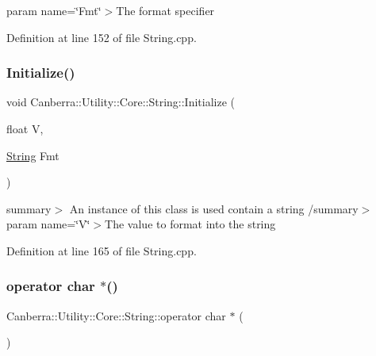param name=\char`\"{}\+Fmt\char`\"{}$>$The format specifier

Definition at line 152 of file String.\+cpp.

\mbox{\label{class_canberra_1_1_utility_1_1_core_1_1_string_ae974f29a017d0b7e7e337d48208efb02_ae974f29a017d0b7e7e337d48208efb02}} 
\subsubsection{\texorpdfstring{Initialize()}{Initialize()}\hspace{0.1cm}{\footnotesize\ttfamily [8/8]}}
{\footnotesize\ttfamily void Canberra\+::\+Utility\+::\+Core\+::\+String\+::\+Initialize (\begin{DoxyParamCaption}\item[{float}]{V,  }\item[{\hyperlink{class_canberra_1_1_utility_1_1_core_1_1_string}{String}}]{Fmt }\end{DoxyParamCaption})\hspace{0.3cm}{\ttfamily [protected]}}

summary$>$ An instance of this class is used contain a string /summary$>$ param name=\char`\"{}\+V\char`\"{}$>$The value to format into the string

Definition at line 165 of file String.\+cpp.

\mbox{\label{class_canberra_1_1_utility_1_1_core_1_1_string_a88957547388ac424a0be4ec16c53cd01_a88957547388ac424a0be4ec16c53cd01}} 
\subsubsection{\texorpdfstring{operator char $\ast$()}{operator char *()}}
{\footnotesize\ttfamily Canberra\+::\+Utility\+::\+Core\+::\+String\+::operator char $\ast$ (\begin{DoxyParamCaption}{ }\end{DoxyParamCaption})}

